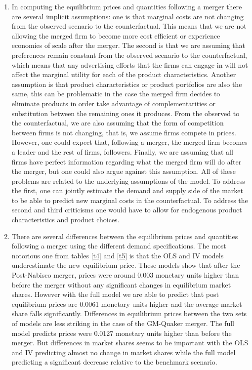 \documentclass[12pt,english]{article}
\begin{document}
\begin{enumerate}
\item In computing the equilibrium prices and quantities following a merger there are several implicit assumptions: one is that marginal costs are not changing from the observed scenario to the counterfactual. This means that we are not allowing the merged firm to become more cost efficient or experience economies of scale after the merger. The second is that we are assuming that preferences remain constant from the observed scenario to the counterfactual, which means that any advertising efforts that the firms can engage in will not affect the marginal utility for each of the product characteristics. Another assumption is that product characteristics or product portfolios are also the same, this can be problematic in the case the merged firm decides to eliminate products in order take advantage of complementarities or substitution between  the remaining ones it produces. From the observed to the counterfactual, we are also assuming that the form of competition between firms is not changing, that is, we assume firms compete in prices. However, one could expect that, following a merger, the merged firm becomes a leader and the rest of firms, followers. Finally, we are assuming that all firms have perfect information regarding what the merged firm will do after the merger, but one could also argue against this assumption. All of these problems are related to the underlying assumptions of the model. To address the first, one can jointly estimate the demand and supply side of the market to be able to predict new marginal costs in the counterfactual. To address the second and third criticisms one would have to allow for endogenous product characteristics and product choices. 

\item There are several differences between the equilibrium prices and quantities following a merger using the different demand specifications. The most notorious one from tables \eqref{t4} and \eqref{t5} is that the OLS and IV models underestimate the new equilibrium price. These models show that after the Post-Nabisco merger, prices were around 0.003 monetary units higher than before the merger without any significant changes in equilibrium market shares. However with the full model we are able to predict that post equilibrium prices are 0.0061 monetary units higher and the average market share falls significantly. Differences in equilibrium prices between the two sets of models are less striking in the case of the GM-Quaker merger. The full model predicts prices were 0.0127 monetary units higher than before the merger. But differences in market shares seems to be important with the OLS and IV predicting almost no change in market shares while the full model predicting a significant decrease relative to the benchmark scenario.

\end{enumerate}
\end{document}
